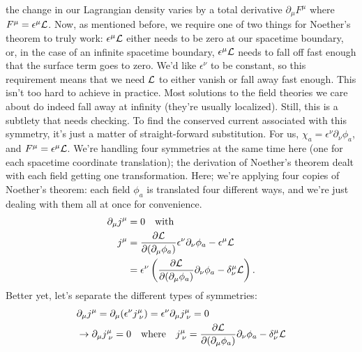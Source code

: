 the change in our Lagrangian density varies by a total derivative $\partial_\mu F^\mu$ where $F^\mu = \epsilon^\mu\mathcal{L}$. Now, as mentioned before, we require one of two things for Noether's theorem to truly work: $\epsilon^\mu\mathcal{L}$ either needs to be zero at our spacetime boundary, or, in the case of an infinite spacetime boundary, $\epsilon^\mu\mathcal{L}$ needs to fall off fast enough that the surface term goes to zero. We'd like $\epsilon^\nu$ to be constant, so this requirement means that we need $\mathcal{L}$ to either vanish or fall away fast enough. This isn't too hard to achieve in practice. Most solutions to the field theories we care about do indeed fall away at infinity (they're usually localized). Still, this is a subtlety that needs checking. To find the conserved current associated with this symmetry, it's just a matter of straight-forward substitution. For us, $\chi_{a} = \epsilon^\nu\partial_\nu\phi_a$, and $F^\mu=\epsilon^\mu\mathcal{L}$. We're handling four symmetries at the same time here (one for each spacetime coordinate translation); the derivation of Noether's theorem dealt with each field getting one transformation. Here; we're applying four copies of Noether's theorem: each field $\phi_a$ is translated four different ways, and we're just dealing with them all at once for convenience.
\begin{align*}
    \partial_\mu j^\mu &= 0 \quad\text{with}\\
    j^\mu &= \frac{\partial\mathcal{L}}{\partial(\partial_\mu\phi_a)}\epsilon^\nu\partial_\nu\phi_a - \epsilon^\mu\mathcal{L}\\
    &= \epsilon^\nu\left(\frac{\partial\mathcal{L}}{\partial(\partial_\mu\phi_a)}\partial_\nu\phi_a - \delta^\mu_{\nu}\mathcal{L}\right).
\end{align*}
Better yet, let's separate the different types of symmetries:
\begin{align*}
    &\partial_\mu j^\mu = \partial_\mu (\epsilon^\nu j^\mu_{\;\nu}) = \epsilon^\nu\partial_\mu j^\mu_{\;\nu}=0\\
    &\rightarrow \partial_\mu j^\mu_{\;\nu}=0 \quad\text{where}\quad j^\mu_{\;\nu} = \frac{\partial\mathcal{L}}{\partial(\partial_\mu\phi_a)}\partial_\nu\phi_a - \delta^\mu_{\nu}\mathcal{L}
\end{align*}
